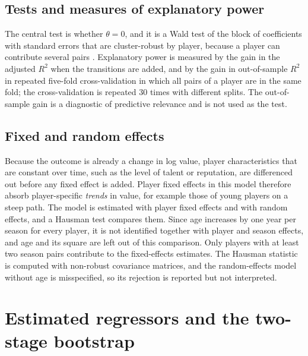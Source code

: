 \subsection{Tests and measures of explanatory power}

The central test is whether $\theta=0$, and it is a Wald test of the block of coefficients with standard errors that are cluster-robust by player, because a player can contribute several pairs \cite{cameron2015practitioner}. Explanatory power is measured by the gain in the adjusted $R^2$ when the transitions are added, and by the gain in out-of-sample $R^2$ in repeated five-fold cross-validation in which all pairs of a player are in the same fold; the cross-validation is repeated 30 times with different splits. The out-of-sample gain is a diagnostic of predictive relevance and is not used as the test.

\subsection{Fixed and random effects}

Because the outcome is already a change in log value, player characteristics that are constant over time, such as the level of talent or reputation, are differenced out before any fixed effect is added. Player fixed effects in this model therefore absorb player-specific \emph{trends} in value, for example those of young players on a steep path. The model is estimated with player fixed effects and with random effects, and a Hausman test \cite{hausman1978specification} compares them. Since age increases by one year per season for every player, it is not identified together with player and season effects, and age and its square are left out of this comparison. Only players with at least two season pairs contribute to the fixed-effects estimates. The Hausman statistic is computed with non-robust covariance matrices, and the random-effects model without age is misspecified, so its rejection is reported but not interpreted.

\section{Estimated regressors and the two-stage bootstrap}
\label{sec:method-bootstrap}


